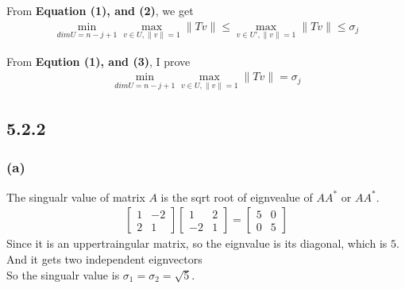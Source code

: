 \documentclass{article}
\begin{document}
From \textbf{Equation (1), and (2)}, we get 
\begin{equation}
    \begin{split}
        \mathop{min} \limits_{dimU = n - j + 1} \mathop{max} \limits _{v \in U, \|v\| = 1} \|Tv\| \le \mathop{max} \limits _{v \in U', \|v\| = 1} \|Tv\| \le \sigma_j
    \end{split}
\end{equation}

From \textbf{Eqution (1), and (3)}, I prove \begin{equation*}
    \begin{split}
        \mathop{min} \limits_{dimU = n - j + 1} \mathop{max} \limits _{v \in U, \|v\| = 1} \|Tv\| = \sigma_j
    \end{split}
\end{equation*} 

\subsection*{5.2.2}
\subsubsection*{(a)}
The singualr value of matrix $A$ is the sqrt root of eignvealue of  $AA^*$ or $AA^*$.
\begin{equation*}
    \begin{split}
        \begin{bmatrix}
            1 & -2 \\ 2 & 1
        \end{bmatrix} \begin{bmatrix}
            1 & 2 \\ -2 & 1
        \end{bmatrix} = \begin{bmatrix}
            5 & 0 \\ 0 & 5
        \end{bmatrix}
    \end{split}
\end{equation*}
Since it is an uppertraingular matrix, so the eignvalue is its diagonal, which is $5$. And it gets two independent eignvectors\\
So the singualr value is $\sigma_1 = \sigma_2 = \sqrt{5}$.
\end{document}
